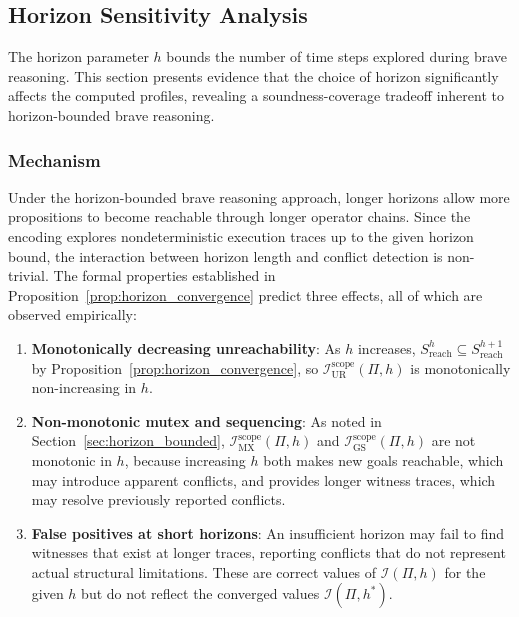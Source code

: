 \subsection{Horizon Sensitivity Analysis}
\label{sec:eval_horizon}

The horizon parameter $h$ bounds the number of time steps explored during brave reasoning. This section presents evidence that the choice of horizon significantly affects the computed profiles, revealing a soundness-coverage tradeoff inherent to horizon-bounded brave reasoning.

\subsubsection{Mechanism}

Under the horizon-bounded brave reasoning approach, longer horizons allow more propositions to become reachable through longer operator chains. Since the encoding explores nondeterministic execution traces up to the given horizon bound, the interaction between horizon length and conflict detection is non-trivial. The formal properties established in Proposition~\ref{prop:horizon_convergence} predict three effects, all of which are observed empirically:

\begin{enumerate}
    \item \textbf{Monotonically decreasing unreachability}: As $h$ increases, $S^h_{\text{reach}} \subseteq S^{h+1}_{\text{reach}}$ by Proposition~\ref{prop:horizon_convergence}, so $\mathcal{I}^{\text{scope}}_{\text{UR}}(\Pi, h)$ is monotonically non-increasing in $h$.
    \item \textbf{Non-monotonic mutex and sequencing}: As noted in Section~\ref{sec:horizon_bounded}, $\mathcal{I}^{\text{scope}}_{\text{MX}}(\Pi, h)$ and $\mathcal{I}^{\text{scope}}_{\text{GS}}(\Pi, h)$ are not monotonic in $h$, because increasing $h$ both makes new goals reachable, which may introduce apparent conflicts, and provides longer witness traces, which may resolve previously reported conflicts.
    \item \textbf{False positives at short horizons}: An insufficient horizon may fail to find witnesses that exist at longer traces, reporting conflicts that do not represent actual structural limitations. These are correct values of $\mathcal{I}(\Pi, h)$ for the given $h$ but do not reflect the converged values $\mathcal{I}(\Pi, h^*)$.
\end{enumerate}

